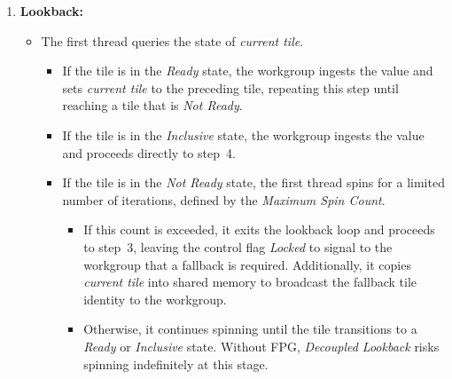 \documentclass[sigconf,screen]{acmart}
\begin{document}
\begin{enumerate}
  \item \textbf{Lookback:}
        \begin{itemize}
          \item The first thread queries the state of \emph{current tile}.
                \begin{itemize}
                  \item If the tile is in the \emph{Ready} state, the workgroup ingests the value and sets \emph{current tile} to the preceding tile, repeating this step until reaching a tile that is \emph{Not Ready}.
                  \item If the tile is in the \emph{Inclusive} state, the workgroup ingests the value and proceeds directly to step~4.
                  \item If the tile is in the \emph{Not Ready} state, the first thread spins for a limited number of iterations, defined by the \emph{Maximum Spin Count}.
                        \begin{itemize}
                          \item If this count is exceeded, it exits the lookback loop and proceeds to step~3, leaving the control flag \emph{Locked} to signal to the workgroup that a fallback is required. Additionally, it copies \emph{current tile} into shared memory to broadcast the fallback tile identity to the workgroup.
                          \item Otherwise, it continues spinning until the tile transitions to a \emph{Ready} or \emph{Inclusive} state. Without FPG, \emph{Decoupled Lookback} risks spinning indefinitely at this stage.
                        \end{itemize}
                \end{itemize}
        \end{itemize}


\end{enumerate}
\end{document}
